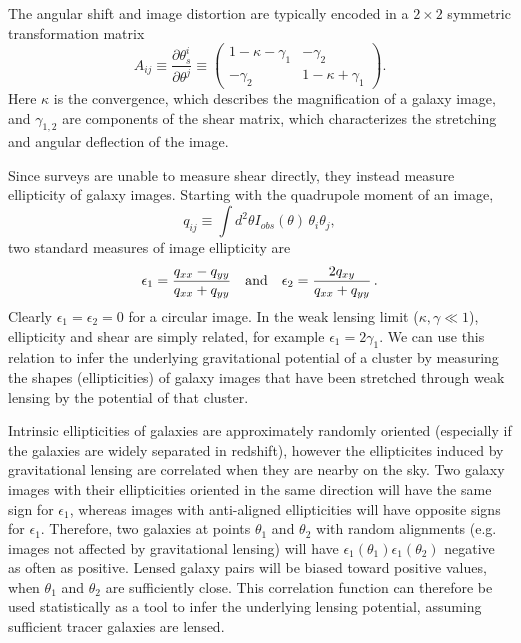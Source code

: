 \documentclass[useAMS,fleqn, usenatbib]{mn2e}
\begin{document}
The angular shift and image distortion are typically  encoded in a $2\times 2$ 
symmetric transformation matrix
\begin{equation}\label{matrix}
A_{ij}\equiv \frac{\partial \theta_s^i}{\partial \theta^j}\equiv 
\begin{pmatrix}
1-\kappa-\gamma_1 & -\gamma_2 \\
-\gamma_2 & 1-\kappa+\gamma_1
\end{pmatrix}.
\end{equation}
Here $\kappa$ is the convergence, which describes the magnification of a galaxy image, 
and $\gamma_{1,2}$ are components of the shear matrix, which characterizes the stretching and angular 
deflection of the image. 
 
Since surveys are unable to measure shear directly, they instead measure ellipticity of galaxy 
images. Starting with   the quadrupole moment of an image,
\begin{equation}
q_{ij}\equiv \int d^2\theta I_{obs}(\theta)\,\theta_i \theta_j ,
\end{equation}
two standard measures of image ellipticity  are 
\begin{equation}
\epsilon_1 = \frac{q_{xx}-q_{yy}}{q_{xx}+q_{yy}}
\quad {\rm and} \quad
\epsilon_2 = \frac{2q_{xy}}{q_{xx}+q_{yy}}\,.
\end{equation}
Clearly $\epsilon_1 = \epsilon_2 = 0$ for a circular image. In the weak 
lensing limit ($\kappa, \gamma\ll1$),  ellipticity and shear are simply related, for example  $\epsilon_1=2\gamma_1$.
We can use this relation to infer the underlying gravitational potential of a cluster
by measuring the shapes (ellipticities) of galaxy images that have been stretched through  weak 
 lensing by the potential of that cluster.

Intrinsic ellipticities of galaxies are 
approximately randomly oriented
 (especially if the galaxies are widely separated in redshift), however
the ellipticites induced by gravitational lensing are correlated when they are nearby on the sky.
Two  galaxy images with their ellipticities oriented in the same direction 
will have the same sign for  $\epsilon_1$, whereas images with anti-aligned ellipticities will have 
opposite signs for $\epsilon_1$. Therefore, two galaxies at points $\theta_1$ and $\theta_2$ with random alignments
(e.g. images not affected by gravitational lensing) will  have 
$\epsilon_1(\theta_1)\epsilon_1(\theta_2) $ negative as often as  positive.  Lensed galaxy pairs 
will be biased toward positive values, when $\theta_1$ and $\theta_2$ are sufficiently close.
This  correlation function can therefore be used statistically as a tool to infer the underlying lensing
potential, assuming sufficient tracer galaxies are lensed. 
 
\end{document}
